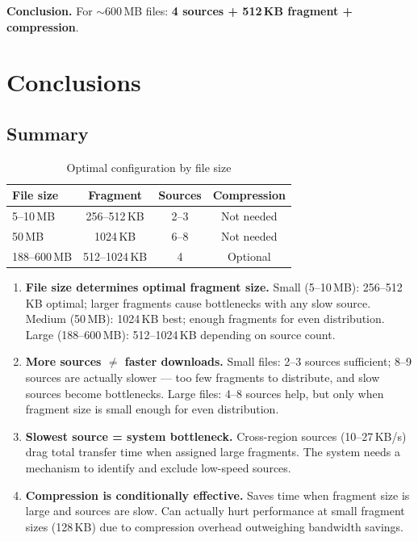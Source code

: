 \documentclass[10pt,twocolumn,a4paper]{article}
\begin{document}
\textbf{Conclusion.} For $\sim$600\,MB files: \textbf{4 sources + 512\,KB fragment + compression}.

\section{Conclusions}

\subsection{Summary}

\begin{table}[H]
\centering
\caption{Optimal configuration by file size}
\scriptsize
\begin{tabular}{@{}lccc@{}}
\toprule
\textbf{File size} & \textbf{Fragment} & \textbf{Sources} & \textbf{Compression} \\
\midrule
5--10\,MB   & 256--512\,KB & 2--3 & Not needed \\
50\,MB      & 1024\,KB     & 6--8 & Not needed \\
188--600\,MB & 512--1024\,KB & 4   & Optional \\
\bottomrule
\end{tabular}
\end{table}

\begin{enumerate}[nosep,leftmargin=1.5em]

\item \textbf{File size determines optimal fragment size.}
  Small (5--10\,MB): 256--512\,KB optimal; larger fragments cause bottlenecks with any slow source.
  Medium (50\,MB): 1024\,KB best; enough fragments for even distribution.
  Large (188--600\,MB): 512--1024\,KB depending on source count.

\item \textbf{More sources $\neq$ faster downloads.}
  Small files: 2--3 sources sufficient; 8--9 sources are actually slower --- too few fragments to distribute, and slow sources become bottlenecks.
  Large files: 4--8 sources help, but only when fragment size is small enough for even distribution.

\item \textbf{Slowest source = system bottleneck.}
  Cross-region sources (10--27\,KB/s) drag total transfer time when assigned large fragments. The system needs a mechanism to identify and exclude low-speed sources.

\item \textbf{Compression is conditionally effective.}
  Saves time when fragment size is large and sources are slow. Can actually hurt performance at small fragment sizes (128\,KB) due to compression overhead outweighing bandwidth savings.

\end{enumerate}
\end{document}
